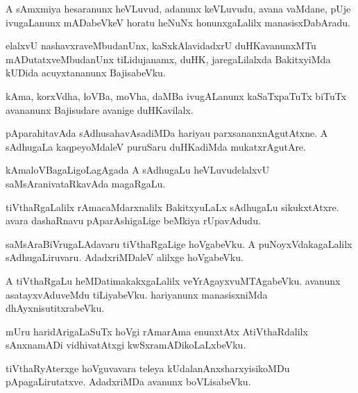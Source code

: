 \documentclass{article}
\begin{document}
\begin{mn}%
A sAmxmiya hesaranunx heVLuvud, adanunx keVLuvudu, avana vaMdane, pUje ivugaLanunx 
mADabeVkeV horatu heNuNx honunxgaLalilx manasisxDabAradu.
\end{mn}

\begin{mn}%
elalxvU nashavxraveMbudanUnx, kaSxkAlavidadxrU duHKavanunxMTu mADutatxveMbudanUnx 
tiLidujanamx, duHK, jaregaLilalxda BakitxyiMda kUDida acuyxtananunx BajisabeVku.
\end{mn}

\begin{mn}%
kAma, korxVdha, loVBa, moVha, daMBa ivugALanunx kaSaTxpaTuTx biTuTx avananunx Bajisudare 
avanige duHKavilalx.
\end{mn}

\begin{mn}%
pAparahitavAda sAdhusahavAsadiMDa hariyau parxsananxnAgutAtxne. A sAdhugaLa kaqpeyoMdaleV 
puruSaru duHKadiMda mukatxrAgutAre.
\end{mn}

\begin{mn}%
kAmaloVBagaLigoLagAgada A sAdhugaLu heVLuvudelalxvU saMsAranivataRkavAda magaRgaLu.
\end{mn}

\begin{mn}%
tiVthaRgaLalilx rAmacaMdarxnalilx BakitxyuLaLx sAdhugaLu sikukxtAtxre. avara dashaRnavu 
pAparAshigaLige beMkiya rUpavAdudu.
\end{mn}

\begin{mn}%
saMsAraBiVrugaLAdavaru tiVthaRgaLige hoVgabeVku. A puNoyxVdakagaLalilx sAdhugaLiruvaru. 
AdadxriMDaleV alilxge hoVgabeVku.
\end{mn}

\begin{mn}%
A tiVthaRgaLu heMDatimakakxgaLalilx veYrAgayxvuMTAgabeVku. avanunx asatayxvAduveMdu 
tiLiyabeVku. hariyanunx manasisxniMda dhAyxnisutitxrabeVku.
\end{mn}

\begin{mn}%
mUru haridArigaLaSuTx hoVgi rAmarAma enunxtAtx AtiVthaRdalilx sAnxnamADi vidhivatAtxgi 
kwSxramADikoLaLxbeVku.
\end{mn}

\begin{mn}%
tiVthaRyAterxge hoVguvavara teleya kUdalanAnxsharxyisikoMDu pApagaLirutatxve. AdadxriMDa 
avanunx boVLisabeVku.
\end{mn}
\end{document}
